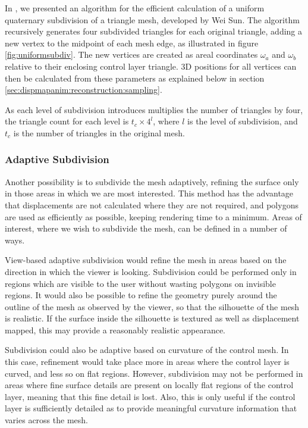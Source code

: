 In \cite{Smith00a}, we presented an algorithm for the efficient calculation of a uniform quaternary subdivision of a triangle mesh, developed by Wei Sun. The algorithm recursively generates four subdivided triangles for each original triangle, adding a new vertex to the midpoint of each mesh edge, as illustrated in figure \ref{fig:uniformsubdiv}. The new vertices are created as areal coordinates $\omega_a$ and $\omega_b$ relative to their enclosing control layer triangle. 3D positions for all vertices can then be calculated from these parameters as explained below in section \ref{sec:dispmapanim:reconstruction:sampling}.

As each level of subdivision introduces multiplies the number of triangles by four, the triangle count for each level is $t_c \times 4^l$, where $l$ is the level of subdivision, and $t_c$ is the number of triangles in the original mesh.

\subsubsection{\label{sec:dispmapanim:reconstruction:subdivision:adaptive}Adaptive Subdivision}

Another possibility is to subdivide the mesh adaptively, refining the surface only in those areas in which we are most interested. This method has the advantage that displacements are not calculated where they are not required, and polygons are used as efficiently as possible, keeping rendering time to a minimum. Areas of interest, where we wish to subdivide the mesh, can be defined in a number of ways.

View-based adaptive subdivision would refine the mesh in areas based on the direction in which the viewer is looking. Subdivision could be performed only in regions which are visible to the user without wasting polygons on invisible regions. It would also be possible to refine the geometry purely around the outline of the mesh as observed by the viewer, so that the silhouette of the mesh is realistic. If the surface inside the silhouette is textured as well as displacement mapped, this may provide a reasonably realistic appearance.

Subdivision could also be adaptive based on curvature of the control mesh. In this case, refinement would take place more in areas where the control layer is curved, and less so on flat regions. However, subdivision may not be performed in areas where fine surface details are present on locally flat regions of the control layer, meaning that this fine detail is lost. Also, this is only useful if the control layer is sufficiently detailed as to provide meaningful curvature information that varies across the mesh. 

